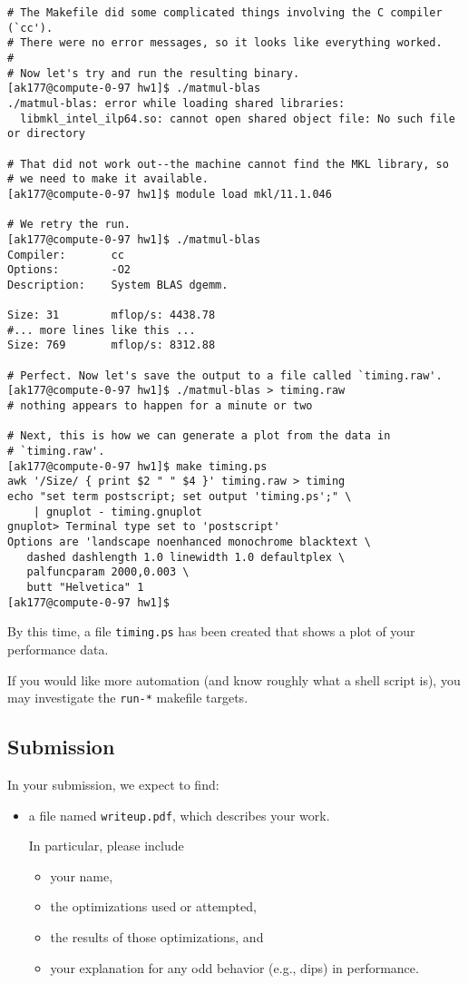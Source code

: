 \documentclass[11pt]{article}
\begin{document}
\begin{enumerate}
\begin{lstlisting}
# The Makefile did some complicated things involving the C compiler (`cc').
# There were no error messages, so it looks like everything worked.
#
# Now let's try and run the resulting binary.
[ak177@compute-0-97 hw1]$ ./matmul-blas
./matmul-blas: error while loading shared libraries:
  libmkl_intel_ilp64.so: cannot open shared object file: No such file or directory

# That did not work out--the machine cannot find the MKL library, so
# we need to make it available.
[ak177@compute-0-97 hw1]$ module load mkl/11.1.046

# We retry the run.
[ak177@compute-0-97 hw1]$ ./matmul-blas
Compiler:       cc
Options:        -O2
Description:    System BLAS dgemm.

Size: 31        mflop/s: 4438.78
#... more lines like this ...
Size: 769       mflop/s: 8312.88

# Perfect. Now let's save the output to a file called `timing.raw'.
[ak177@compute-0-97 hw1]$ ./matmul-blas > timing.raw
# nothing appears to happen for a minute or two

# Next, this is how we can generate a plot from the data in
# `timing.raw'.
[ak177@compute-0-97 hw1]$ make timing.ps
awk '/Size/ { print $2 " " $4 }' timing.raw > timing
echo "set term postscript; set output 'timing.ps';" \
    | gnuplot - timing.gnuplot
gnuplot> Terminal type set to 'postscript'
Options are 'landscape noenhanced monochrome blacktext \
   dashed dashlength 1.0 linewidth 1.0 defaultplex \
   palfuncparam 2000,0.003 \
   butt "Helvetica" 1
[ak177@compute-0-97 hw1]$
\end{lstlisting}
By this time, a file \texttt{timing.ps} has been created that shows a
plot of your performance data.

If you would like more automation (and know roughly what a shell
script is), you may investigate the \texttt{run-*} makefile targets.

\subsection*{Submission}

In your submission, we expect to find:

\begin{itemize}
  \item a file named \texttt{writeup.pdf}, which describes your work.

  In particular, please include
  \begin{itemize}
    \item your name,
    \item the optimizations used or attempted,
    \item the results of those optimizations, and
    \item your explanation for any odd behavior (e.g., dips) in performance.
  \end{itemize}


\end{itemize}
\end{enumerate}
\end{document}
